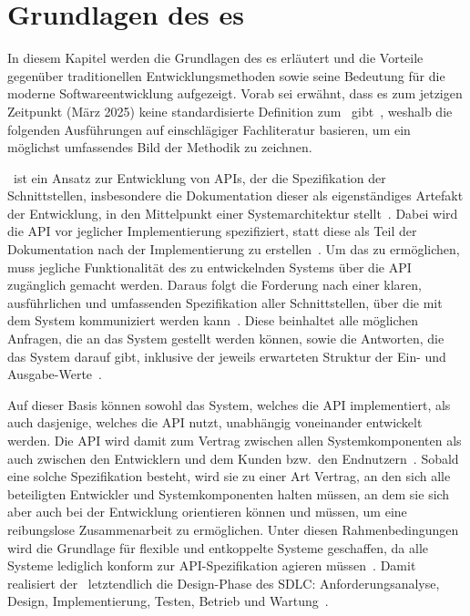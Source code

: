 \chapter{Grundlagen des \AFA es}
In diesem Kapitel werden die Grundlagen des \AFA es erläutert und die Vorteile gegenüber traditionellen Entwicklungsmethoden sowie seine Bedeutung für die moderne Softwareentwicklung aufgezeigt.
Vorab sei erwähnt, dass es zum jetzigen Zeitpunkt (März 2025) keine standardisierte Definition zum \AFA\ gibt~\autocite[77]{bea22}, weshalb die folgenden Ausführungen auf einschlägiger Fachliteratur basieren, um ein möglichst umfassendes Bild der Methodik zu zeichnen.

\AF\ ist ein Ansatz zur Entwicklung von \acp{API}, der die Spezifikation der Schnittstellen, insbesondere die Dokumentation dieser als eigenständiges Artefakt der Entwicklung, in den Mittelpunkt einer Systemarchitektur stellt~\autocite[2]{kul23}.
Dabei wird die \ac{API} vor jeglicher Implementierung spezifiziert, statt diese als Teil der Dokumentation nach der Implementierung zu erstellen~\autocites[1627]{cha21}[349]{de23}.
Um das zu ermöglichen, muss jegliche Funktionalität des zu entwickelnden Systems über die \ac{API} zugänglich gemacht werden.
Daraus folgt die Forderung nach einer klaren, ausführlichen und umfassenden Spezifikation aller Schnittstellen, über die mit dem System kommuniziert werden kann~\autocite[75]{bea22}.
Diese beinhaltet alle möglichen Anfragen, die an das System gestellt werden können, sowie die Antworten, die das System darauf gibt, inklusive der jeweils erwarteten Struktur der Ein- und Ausgabe-Werte~\autocite[350]{de23}.

Auf dieser Basis können sowohl das System, welches die \ac{API} implementiert, als auch dasjenige, welches die \ac{API} nutzt, unabhängig voneinander entwickelt werden.
Die \ac{API} wird damit zum Vertrag zwischen allen Systemkomponenten als auch zwischen den Entwicklern und dem Kunden bzw.\ den Endnutzern~\autocite[1627]{cha21}.
Sobald eine solche Spezifikation besteht, wird sie zu einer Art Vertrag, an den sich alle beteiligten Entwickler und Systemkomponenten halten müssen, an dem sie sich aber auch bei der Entwicklung orientieren können und müssen, um eine reibungslose Zusammenarbeit zu ermöglichen.
Unter diesen Rahmenbedingungen wird die Grundlage für flexible und entkoppelte Systeme geschaffen, da alle Systeme lediglich konform zur \ac{API}-Spezifikation agieren müssen~\autocite[350,354,360]{de23}.
Damit realisiert der \AFA\ letztendlich die Design-Phase des \ac{SDLC}: Anforderungsanalyse, Design, Implementierung, Testen, Betrieb und Wartung~\autocite{vol22}.


